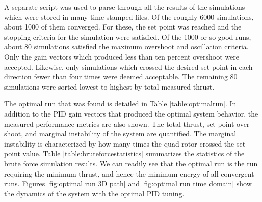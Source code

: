 A separate script was used to parse through all the results of the simulations which were stored in many time-stamped files. Of the roughly 6000 simulations, about 1000 of them converged. For these, the set point was reached and the stopping criteria for the simulation were satisfied. Of the 1000 or so good runs, about 80 simulations satisfied the maximum overshoot and oscillation criteria. Only the gain vectors which produced less than ten percent overshoot were accepted. Likewise, only simulations which crossed the desired set point in each direction fewer than four times were deemed acceptable. The remaining 80 simulations were sorted lowest to highest by total measured thrust.

The optimal run that was found is detailed in Table \ref{table:optimalrun}.  In addition to the PID gain vectors that produced the optimal system behavior, the measured performance metrics are also shown. The total thrust, set-point over shoot, and marginal instability of the system are quantified. The marginal instability is characterized by how many times the quad-rotor crossed the set-point value. Table \ref{table:bruteforcestatistics} summarizes the statistics of the brute force simulation results. We can readily see that the optimal run is the run requiring the minimum thrust, and hence the minimum energy of all convergent runs. Figures \ref{fig:optimal run 3D path} and \ref{fig:optimal run time domain} show the dynamics of the system with the optimal PID tuning.

